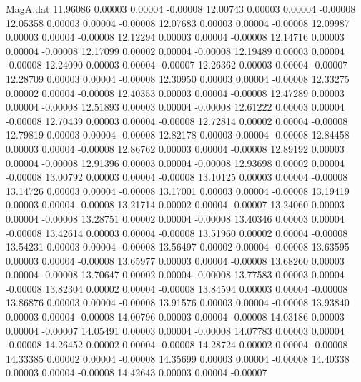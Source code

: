 \begin{filecontents}{MagA.dat}
  11.96086    0.00003    0.00004   -0.00008
  12.00743    0.00003    0.00004   -0.00008
  12.05358    0.00003    0.00004   -0.00008
  12.07683    0.00003    0.00004   -0.00008
  12.09987    0.00003    0.00004   -0.00008
  12.12294    0.00003    0.00004   -0.00008
  12.14716    0.00003    0.00004   -0.00008
  12.17099    0.00002    0.00004   -0.00008
  12.19489    0.00003    0.00004   -0.00008
  12.24090    0.00003    0.00004   -0.00007
  12.26362    0.00003    0.00004   -0.00007
  12.28709    0.00003    0.00004   -0.00008
  12.30950    0.00003    0.00004   -0.00008
  12.33275    0.00002    0.00004   -0.00008
  12.40353    0.00003    0.00004   -0.00008
  12.47289    0.00003    0.00004   -0.00008
  12.51893    0.00003    0.00004   -0.00008
  12.61222    0.00003    0.00004   -0.00008
  12.70439    0.00003    0.00004   -0.00008
  12.72814    0.00002    0.00004   -0.00008
  12.79819    0.00003    0.00004   -0.00008
  12.82178    0.00003    0.00004   -0.00008
  12.84458    0.00003    0.00004   -0.00008
  12.86762    0.00003    0.00004   -0.00008
  12.89192    0.00003    0.00004   -0.00008
  12.91396    0.00003    0.00004   -0.00008
  12.93698    0.00002    0.00004   -0.00008
  13.00792    0.00003    0.00004   -0.00008
  13.10125    0.00003    0.00004   -0.00008
  13.14726    0.00003    0.00004   -0.00008
  13.17001    0.00003    0.00004   -0.00008
  13.19419    0.00003    0.00004   -0.00008
  13.21714    0.00002    0.00004   -0.00007
  13.24060    0.00003    0.00004   -0.00008
  13.28751    0.00002    0.00004   -0.00008
  13.40346    0.00003    0.00004   -0.00008
  13.42614    0.00003    0.00004   -0.00008
  13.51960    0.00002    0.00004   -0.00008
  13.54231    0.00003    0.00004   -0.00008
  13.56497    0.00002    0.00004   -0.00008
  13.63595    0.00003    0.00004   -0.00008
  13.65977    0.00003    0.00004   -0.00008
  13.68260    0.00003    0.00004   -0.00008
  13.70647    0.00002    0.00004   -0.00008
  13.77583    0.00003    0.00004   -0.00008
  13.82304    0.00002    0.00004   -0.00008
  13.84594    0.00003    0.00004   -0.00008
  13.86876    0.00003    0.00004   -0.00008
  13.91576    0.00003    0.00004   -0.00008
  13.93840    0.00003    0.00004   -0.00008
  14.00796    0.00003    0.00004   -0.00008
  14.03186    0.00003    0.00004   -0.00007
  14.05491    0.00003    0.00004   -0.00008
  14.07783    0.00003    0.00004   -0.00008
  14.26452    0.00002    0.00004   -0.00008
  14.28724    0.00002    0.00004   -0.00008
  14.33385    0.00002    0.00004   -0.00008
  14.35699    0.00003    0.00004   -0.00008
  14.40338    0.00003    0.00004   -0.00008
  14.42643    0.00003    0.00004   -0.00007

\end{filecontents}
